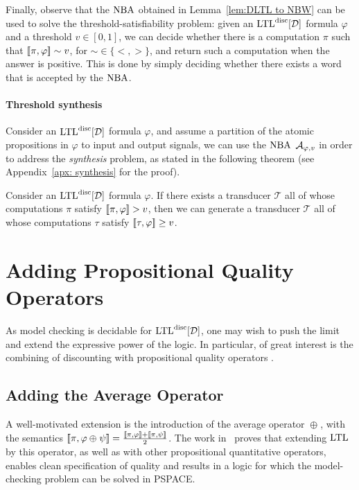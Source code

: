 \documentclass{llncs}
\newcommand{\LTL}{{\ensuremath{\rm LTL}}\xspace}
\newcommand{\T}{{\mathcal T}}
\newcommand{\NBW}{\mbox{\rm NBA}\xspace}
\newcommand{\D}{{\cal D}}
\newcommand{\A}{{\cal A}}
\newcommand{\avg}[1]{\oplus_{#1}}
\renewcommand{\phi}{\varphi}
\newcommand{\DLTL}{\ensuremath{\LTL^{\text{disc}}[\D]}}
\newcommand{\LTLD}{\DLTL}
\begin{document}
Finally, observe that the $\NBW$ obtained in Lemma~\ref{lem:DLTL to NBW} can be used to solve the threshold-satisfiability problem: given an $\DLTL$ formula $\phi$ and a threshold $v\in [0,1]$, we can decide whether there is a computation $\pi$ such that $\sem{\pi,\phi}\sim v$, for $\sim \in \{ <, >\}$, and return such a computation when the answer is positive. This is done by simply deciding whether there exists a word that is accepted by the $\NBW$.


\paragraph{Threshold synthesis}
\label{rmk:SAT and synthesis}
Consider an $\LTLD$ formula $\phi$, and assume a partition of the atomic propositions in $\phi$ to input and output signals, we can use the $\NBW$ $\A_{\phi,v}$ in order to address the {\em synthesis} problem, as stated in the following theorem (see Appendix~\ref{apx: synthesis} for the proof).
\begin{theorem}
\label{thm:synthesis}
Consider an $\LTLD$ formula $\phi$. If there exists a transducer $\T$ all of whose computations $\pi$ satisfy $\sem{\pi,\phi}> v$, then we can generate a transducer $\T$ all of whose computations $\tau$ satisfy $\sem{\tau,\phi}\ge v$.
\end{theorem}




\section{Adding Propositional Quality Operators}
\label{sec:adding quality}

As model checking is decidable for $\DLTL$, one may wish to push the limit and extend the expressive power of the logic. In particular, of great interest is the combining of discounting with propositional quality operators \cite{ABK13}.
\subsection{Adding the Average Operator}
\label{sec:average}
A well-motivated extension is the introduction of the average operator $\avg{}$, with the semantics $\sem{\pi,\phi\avg{}\psi}=\frac{\sem{\pi,\phi}+\sem{\pi,\psi}}{2}$.
The work in~\cite{ABK13} proves that extending $\LTL$ by this operator, as well as with other propositional quantitative operators, enables clean specification of quality and results in a logic for which the model-checking problem can be solved in PSPACE.
\end{document}
